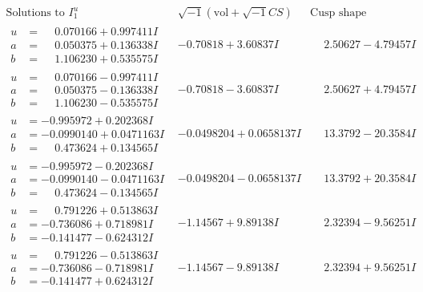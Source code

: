 \documentclass[1p]{elsarticle_modified}
\theoremstyle{definition}
\newcommand{\I}{\sqrt{-1}}
\begin{document}
$$\begin{array}{c|c|c}  
\text{Solutions to }I^u_{1}& \I (\text{vol} + \sqrt{-1}CS) & \text{Cusp shape}\\
 \hline 
\begin{aligned}
u &= \phantom{-}0.070166 + 0.997411 I \\
a &= \phantom{-}0.050375 + 0.136338 I \\
b &= \phantom{-}1.106230 + 0.535575 I\end{aligned}
 & -0.70818 + 3.60837 I & \phantom{-}2.50627 - 4.79457 I \\ \hline\begin{aligned}
u &= \phantom{-}0.070166 - 0.997411 I \\
a &= \phantom{-}0.050375 - 0.136338 I \\
b &= \phantom{-}1.106230 - 0.535575 I\end{aligned}
 & -0.70818 - 3.60837 I & \phantom{-}2.50627 + 4.79457 I \\ \hline\begin{aligned}
u &= -0.995972 + 0.202368 I \\
a &= -0.0990140 + 0.0471163 I \\
b &= \phantom{-}0.473624 + 0.134565 I\end{aligned}
 & -0.0498204 + 0.0658137 I & \phantom{-}13.3792 - 20.3584 I \\ \hline\begin{aligned}
u &= -0.995972 - 0.202368 I \\
a &= -0.0990140 - 0.0471163 I \\
b &= \phantom{-}0.473624 - 0.134565 I\end{aligned}
 & -0.0498204 - 0.0658137 I & \phantom{-}13.3792 + 20.3584 I \\ \hline\begin{aligned}
u &= \phantom{-}0.791226 + 0.513863 I \\
a &= -0.736086 + 0.718981 I \\
b &= -0.141477 - 0.624312 I\end{aligned}
 & -1.14567 + 9.89138 I & \phantom{-}2.32394 - 9.56251 I \\ \hline\begin{aligned}
u &= \phantom{-}0.791226 - 0.513863 I \\
a &= -0.736086 - 0.718981 I \\
b &= -0.141477 + 0.624312 I\end{aligned}
 & -1.14567 - 9.89138 I & \phantom{-}2.32394 + 9.56251 I \\ \hline\begin{aligned}

\end{aligned}
\end{array}$$
\end{document}
